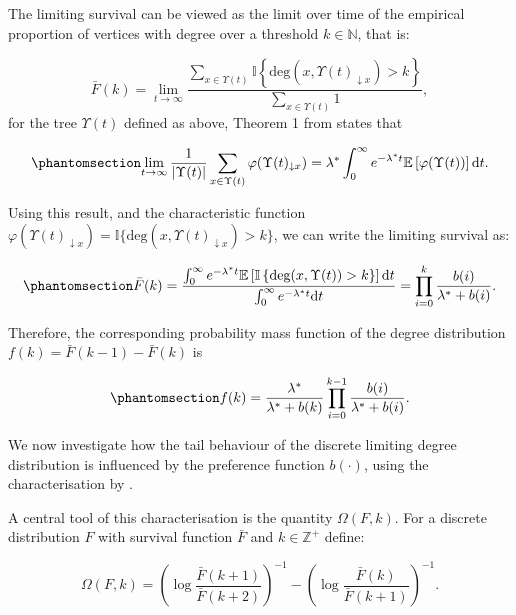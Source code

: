 \documentclass[
  sn-basic,
  10pt,
]{sn-jnl}
\theoremstyle{plain}
\theoremstyle{plain}
\theoremstyle{remark}
\begin{document}
The limiting survival can be viewed as the limit over time of the
empirical proportion of vertices with degree over a threshold
\(k\in\mathbb N\), that is:

\[
\bar F(k) = \lim_{t\rightarrow\infty}\frac{\sum_{x\in\Upsilon(t)}\mathbb I\left\{\text{deg}(x,\Upsilon(t)_{\downarrow x})>k\right\}}{\sum_{x\in\Upsilon(t)} 1},
\] for the tree \(\Upsilon(t)\) defined as above, Theorem 1 from
\citet{rudas07} states that

\begin{equation}\phantomsection\label{eq-survlim}{
\lim_{t\rightarrow\infty}\frac{1}{|\Upsilon(t)|}\sum_{x\in\Upsilon(t)}\varphi(\Upsilon(t)_{\downarrow x}) = \lambda^* \int_0^\infty e^{-\lambda^* t}\mathbb E\left[\varphi(\Upsilon(t))\right]\text{d}t.
}\end{equation}

Using this result, and the characteristic function
\(\varphi(\Upsilon(t)_{\downarrow x}) = \mathbb I\{\text{deg}(x,\Upsilon(t)_{\downarrow x})>k\}\),
we can write the limiting survival as:

\begin{equation}\phantomsection\label{eq-surv-origin}{
\bar F(k) = \frac{\int_0^\infty e^{-\lambda^* t}\mathbb E\left[\mathbb I\left\{\text{deg}(x,\Upsilon(t))>k\right\}\right]\text{d}t}{\int_0^\infty e^{-\lambda^* t}\text{d}t} = \prod_{i=0}^k\frac{b(i)}{\lambda^* + b(i)}.
}\end{equation}

Therefore, the corresponding probability mass function of the degree
distribution \(f(k) = \bar F(k-1) - \bar F(k)\) is

\begin{equation}\phantomsection\label{eq-pmf-origin}{
f(k) = \frac{\lambda^*}{\lambda^* + b(k)}\prod_{i=0}^{k-1}\frac{b(i)}{\lambda^*+b(i)}.
}\end{equation}

We now investigate how the tail behaviour of the discrete limiting
degree distribution is influenced by the preference function \(b(·)\),
using the characterisation by \citet{shimura12}.

A central tool of this characterisation is the quantity \(\Omega(F,k)\).
For a discrete distribution \(F\) with survival function \(\bar F\) and
\(k\in\mathbb Z^+\) define:

\[
\Omega(F,k) = \left(\log\displaystyle\frac{\bar F (k+1)}{\bar F (k+2)}\right)^{-1} - \left(\log\displaystyle\frac{\bar F (k)}{\bar F (k+1)}\right)^{-1}.
\]
\end{document}
